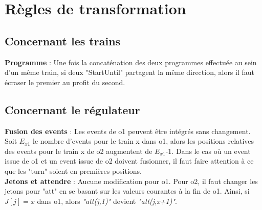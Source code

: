 \documentclass[12pt]{article}
\begin{document}
\section{Règles de transformation}
\subsection{Concernant les trains}

\textbf{Programme} :
Une fois la concaténation des deux programmes effectuée au sein d'un même train, si deux
"StartUntil" partagent la même direction, alors il faut {\color{Plum}écraser le premier au profit du second}. 

\subsection{Concernant le régulateur}
\textbf{Fusion des events} :
Les events de o1 peuvent être {\color{Plum}intégrés sans changement}. 
Soit $E_{x1}$ le nombre d'events pour le train x dans o1, alors les positions relatives
des events pour le train x de o2 {\color{Plum}augmentent de $E_{x1}$-1}.
Dans le cas où un event issue de o1 et un event issue de o2 doivent fusionner, il faut
faire attention à ce que les "turn" soient en premières positions.
\vspace{0.5cm}\\
\textbf{Jetons et attendre} :
{\color{Plum}Aucune modification} pour o1.
Pour o2, il faut changer les jetons pour "att" {\color{Plum}en se basant sur les valeurs courantes
à la fin de o1}. Ainsi, si $J[j] = x$ dans o1, alors \textit{"att(j,1)"} devient
\textit{"att(j,x+1)"}.
\end{document}
